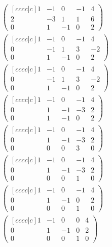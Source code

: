\begin{align}
    \begin{pmatrix}[cccc|c]
      1 & -1 & 0 & -1  & 4 \\
      2 & -3 & 1 & 1 & 6 \\
      0 & 1 & -1 & 0 & 2
    \end{pmatrix} \\
    \begin{pmatrix}[cccc|c]
      1 & -1 & 0 & -1  & 4 \\
      0 & -1 & 1 & 3 & -2 \\
      0 & 1 & -1 & 0 & 2
    \end{pmatrix} \\
    \begin{pmatrix}[cccc|c]
      1 & -1 & 0 & -1  & 4 \\
      0 & -1 & 1 & 3 & -2 \\
      0 & 1 & -1 & 0 & 2
    \end{pmatrix} \\
    \begin{pmatrix}[cccc|c]
      1 & -1 & 0 & -1  & 4 \\
      0 & 1 & -1 & -3 & 2 \\
      0 & 1 & -1 & 0 & 2
    \end{pmatrix} \\
    \begin{pmatrix}[cccc|c]
      1 & -1 & 0 & -1  & 4 \\
      0 & 1 & -1 & -3 & 2 \\
      0 & 0 & 0 & 3 & 0
    \end{pmatrix} \\
    \begin{pmatrix}[cccc|c]
      1 & -1 & 0 & -1  & 4 \\
      0 & 1 & -1 & -3 & 2 \\
      0 & 0 & 0 & 1 & 0
    \end{pmatrix} \\
    \begin{pmatrix}[cccc|c]
      1 & -1 & 0 & -1  & 4 \\
      0 & 1 & -1 & 0 & 2 \\
      0 & 0 & 0 & 1 & 0
    \end{pmatrix} \\
    \begin{pmatrix}[cccc|c]
      1 & -1 & 0 & 0  & 4 \\
      0 & 1 & -1 & 0 & 2 \\
      0 & 0 & 0 & 1 & 0
    \end{pmatrix} \\
\end{align}

